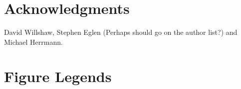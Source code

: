 \documentclass[10pt]{article}
\begin{document}
\section*{Acknowledgments}

David Willshaw, Stephen Eglen (Perhaps should go on the author list?)
and Michael Herrmann.

\newcommand{\myshortjournaltitles}{}

%

\section*{Figure Legends}
\end{document}
